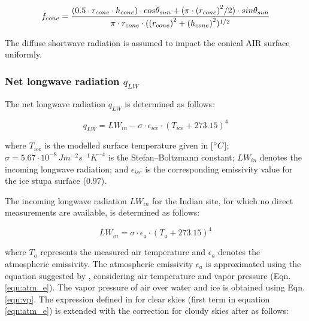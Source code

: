 \begin{equation}
	\begin{split}
		f_{cone}& =\frac{(0.5 \cdot r_{cone} \cdot h_{cone}) \cdot cos \theta_{sun} +(\pi \cdot
		{(r_{cone})}^2/2) \cdot sin \theta_{sun} }{\pi \cdot r_{cone} \cdot ({(r_{cone})}^2+{(h_{cone})}^2)^{1/2}}\\
	\end{split}
	\label{eqn:f_{cone} }
\end{equation}

The diffuse shortwave radiation is assumed to impact the conical \ac{AIR} surface uniformly.

\subsubsection{Net longwave radiation \texorpdfstring{$q_{LW}$}{Lg}} \label{sec:LW}

The net longwave radiation $q_{LW}$ is determined as follows:

\begin{equation}
	q_{LW}= LW_{in}-\sigma \cdot \epsilon_{ice} \cdot {(T_{ice}+ 273.15)}^4
	\label{eqn:LW}
\end{equation}

where $T_{ice}$ is the modelled surface temperature given in [$^{\circ} C$];
$\sigma=5.67\cdot10^{-8}\,Jm^{-2}s^{-1}K^{-4}$ is the Stefan–Boltzmann constant; $LW_{in}$ denotes the incoming
longwave radiation; and $\epsilon_{ice}$ is the corresponding emissivity value for the ice stupa surface (0.97).

The incoming longwave radiation $LW_{in}$ for the Indian site, for which no direct measurements are available, is
determined as follows:

\begin{equation}
	LW_{in}=\sigma \cdot \epsilon_a \cdot {(T_a+ 273.15)}^4
	\label{eqn:LWin}
\end{equation}

where $T_a$ represents the measured air temperature and $\epsilon_a$ denotes the atmospheric emissivity. The atmospheric emissivity $\epsilon_a$ is approximated using the equation suggested by \cite{brutsaertEvaporationAtmosphereTheory1982},
considering air temperature and vapor pressure (Eqn.  \ref{eqn:atm_e}). The vapor pressure of air over water and
ice is obtained using Eqn. \ref{eqn:vp}. The expression defined in \cite{brutsaertDerivableFormulaLongwave1975} for clear skies
(first term in equation \ref{eqn:atm_e}) is extended with the correction for cloudy skies after
\cite{brutsaertEvaporationAtmosphereTheory1982} as follows:

